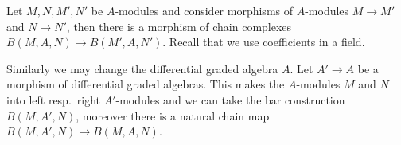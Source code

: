 \documentclass{scrartcl}
\theoremstyle{plain}
\theoremstyle{definition}
\begin{document}


Let $M, N, M', N'$ be $A$-modules and consider morphisms of $A$-modules $M\to M'$ and $N\to N'$, then there is a morphism of chain complexes $B(M, A, N)\to B(M', A, N')$. Recall that we use coefficients in a field.

Similarly we may change the differential graded algebra $A$. Let $A'\to A$ be a morphism of differential graded algebras. This makes the $A$-modules $M$ and $N$ into left resp.\ right $A'$-modules and we can take the bar construction $B(M, A', N)$, moreover there is a natural chain map $B(M, A', N)\to B(M, A, N)$.
\end{document}
